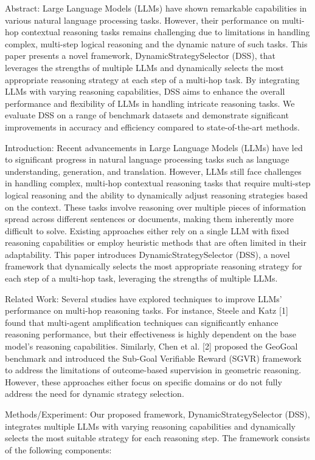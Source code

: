Abstract:
Large Language Models (LLMs) have shown remarkable capabilities in various natural language processing tasks. However, their performance on multi-hop contextual reasoning tasks remains challenging due to limitations in handling complex, multi-step logical reasoning and the dynamic nature of such tasks. This paper presents a novel framework, DynamicStrategySelector (DSS), that leverages the strengths of multiple LLMs and dynamically selects the most appropriate reasoning strategy at each step of a multi-hop task. By integrating LLMs with varying reasoning capabilities, DSS aims to enhance the overall performance and flexibility of LLMs in handling intricate reasoning tasks. We evaluate DSS on a range of benchmark datasets and demonstrate significant improvements in accuracy and efficiency compared to state-of-the-art methods.

Introduction:
Recent advancements in Large Language Models (LLMs) have led to significant progress in natural language processing tasks such as language understanding, generation, and translation. However, LLMs still face challenges in handling complex, multi-hop contextual reasoning tasks that require multi-step logical reasoning and the ability to dynamically adjust reasoning strategies based on the context. These tasks involve reasoning over multiple pieces of information spread across different sentences or documents, making them inherently more difficult to solve. Existing approaches either rely on a single LLM with fixed reasoning capabilities or employ heuristic methods that are often limited in their adaptability. This paper introduces DynamicStrategySelector (DSS), a novel framework that dynamically selects the most appropriate reasoning strategy for each step of a multi-hop task, leveraging the strengths of multiple LLMs.

Related Work:
Several studies have explored techniques to improve LLMs' performance on multi-hop reasoning tasks. For instance, Steele and Katz [1] found that multi-agent amplification techniques can significantly enhance reasoning performance, but their effectiveness is highly dependent on the base model's reasoning capabilities. Similarly, Chen et al. [2] proposed the GeoGoal benchmark and introduced the Sub-Goal Verifiable Reward (SGVR) framework to address the limitations of outcome-based supervision in geometric reasoning. However, these approaches either focus on specific domains or do not fully address the need for dynamic strategy selection.

Methods/Experiment:
Our proposed framework, DynamicStrategySelector (DSS), integrates multiple LLMs with varying reasoning capabilities and dynamically selects the most suitable strategy for each reasoning step. The framework consists of the following components:

